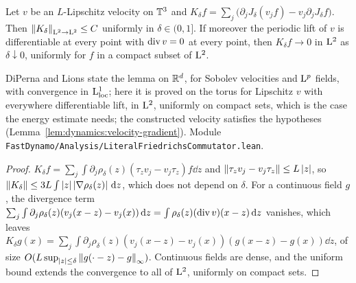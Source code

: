 \begin{lemma}
  \label{lem:vanishing:friedrichs}
  \leanok
  Let $v$ be an $L$-Lipschitz velocity on $\mathbb{T}^3$ and
  $K_\delta f=\sum_j\bigl(\partial_jJ_\delta(v_jf)-v_j\partial_jJ_\delta f\bigr)$.  Then
  $\left\|K_\delta\right\|_{\mathrm{L}^2\to\mathrm{L}^2}\leq C$ uniformly in $\delta\in(0,1]$.  If moreover the
  periodic lift of $v$ is differentiable at every point with $\operatorname{div} v=0$ at every point, then
  $K_\delta f\to0$ in $\mathrm{L}^2$ as $\delta\downarrow0$, uniformly for $f$ in a compact subset of
  $\mathrm{L}^2$.
\end{lemma}

DiPerna and Lions state the lemma on $\mathbb{R}^d$, for Sobolev velocities and $\mathrm{L}^p$ fields, with
convergence in $\mathrm{L}^1_{\rm loc}$; here it is proved on the torus for Lipschitz $v$ with
everywhere differentiable lift, in $\mathrm{L}^2$, uniformly on compact sets, which is the case the
energy estimate needs; the constructed velocity satisfies the hypotheses
(Lemma~\ref{lem:dynamics:velocity-gradient}).  Module
\texttt{FastDynamo/Analysis/LiteralFriedrichsCommutator.lean}.

\begin{proof}
  \leanok
  $K_\delta f=\sum_j\int\partial_j\rho_\delta(z)(\tau_zv_j-v_j\tau_z)f\dd z$ and
  $\left\|\tau_zv_j-v_j\tau_z\right\|\leq L\left\lvert z\right\rvert$, so
  $\left\|K_\delta\right\|\leq3L\int\left\lvert z\right\rvert\left\lvert\nabla\rho_\delta(z)\right\rvert\,\mathrm{d} z$, which does not depend on
  $\delta$.  For a continuous field $g$, the divergence term
  $\sum_j\int\partial_j\rho_\delta(z)(v_j(x-z)-v_j(x))\,\mathrm{d} z=\int\rho_\delta(z)(\operatorname{div} v)(x-z)\,\mathrm{d} z$
  vanishes, which leaves
  $K_\delta g(x)=\sum_j\int\partial_j\rho_\delta(z)(v_j(x-z)-v_j(x))(g(x-z)-g(x))\dd z$, of size
  $O(L\sup_{\left\lvert z\right\rvert\leq\delta}\left\|g(\cdot-z)-g\right\|_\infty)$.  Continuous fields are dense, and
  the uniform bound extends the convergence to all of $\mathrm{L}^2$, uniformly on compact sets.
\end{proof}

